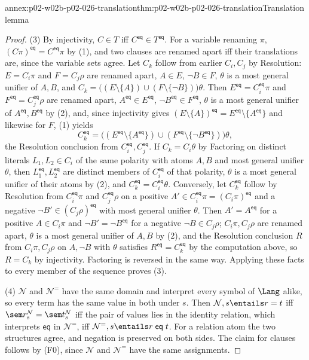 \begin{annexitem}{annex:p02-w02b-p02-026-translation}{thm:p02-w02b-p02-026-translation}{Translation lemma}
\begin{proof}
(3)  By injectivity, \(C\in T\) iff \(C^{\mathsf{eq}}\in T^{\mathsf{eq}}\).
For a variable renaming \(\pi\), \((C\pi)^{\mathsf{eq}}=C^{\mathsf{eq}}\pi\)
by (1), and two clauses are renamed apart iff their translations are, since
the variable sets agree.  Let \(C_k\) follow from earlier \(C_i,C_j\) by
Resolution: \(E=C_i\pi\) and \(F=C_j\rho\) are renamed apart, \(A\in E\),
\(\neg B\in F\), \(\theta\) is a most general unifier of \(A,B\), and
\(C_k=\bigl((E\setminus\{A\})\cup(F\setminus\{\neg B\})\bigr)\theta\).  Then
\(E^{\mathsf{eq}}=C_i^{\mathsf{eq}}\pi\) and
\(F^{\mathsf{eq}}=C_j^{\mathsf{eq}}\rho\) are renamed apart,
\(A^{\mathsf{eq}}\in E^{\mathsf{eq}}\), \(\neg B^{\mathsf{eq}}\in F^{\mathsf{eq}}\),
\(\theta\) is a most general unifier of \(A^{\mathsf{eq}},B^{\mathsf{eq}}\) by
(2), and, since injectivity gives
\((E\setminus\{A\})^{\mathsf{eq}}=E^{\mathsf{eq}}\setminus\{A^{\mathsf{eq}}\}\)
and likewise for \(F\), (1) yields
\[
 C_k^{\mathsf{eq}}
 =\bigl((E^{\mathsf{eq}}\setminus\{A^{\mathsf{eq}}\})\cup
   (F^{\mathsf{eq}}\setminus\{\neg B^{\mathsf{eq}}\})\bigr)\theta ,
\]
the Resolution conclusion from \(C_i^{\mathsf{eq}},C_j^{\mathsf{eq}}\).  If
\(C_k=C_i\theta\) by Factoring on distinct literals \(L_1,L_2\in C_i\) of the
same polarity with atoms \(A,B\) and most general unifier \(\theta\), then
\(L_1^{\mathsf{eq}},L_2^{\mathsf{eq}}\) are distinct members of
\(C_i^{\mathsf{eq}}\) of that polarity, \(\theta\) is a most general unifier
of their atoms by (2), and \(C_k^{\mathsf{eq}}=C_i^{\mathsf{eq}}\theta\).
Conversely, let \(C_k^{\mathsf{eq}}\) follow by Resolution from
\(C_i^{\mathsf{eq}}\pi\) and \(C_j^{\mathsf{eq}}\rho\) on a positive
\(A'\in C_i^{\mathsf{eq}}\pi=(C_i\pi)^{\mathsf{eq}}\) and a negative
\(\neg B'\in(C_j\rho)^{\mathsf{eq}}\) with most general unifier \(\theta\).
Then \(A'=A^{\mathsf{eq}}\) for a positive \(A\in C_i\pi\) and
\(\neg B'=\neg B^{\mathsf{eq}}\) for a negative \(\neg B\in C_j\rho\);
\(C_i\pi,C_j\rho\) are renamed apart, \(\theta\) is a most general unifier of
\(A,B\) by (2), and the Resolution conclusion \(R\) from \(C_i\pi,C_j\rho\) on
\(A,\neg B\) with \(\theta\) satisfies \(R^{\mathsf{eq}}=C_k^{\mathsf{eq}}\) by
the computation above, so \(R=C_k\) by injectivity.  Factoring is reversed in
the same way.  Applying these facts to every member of the sequence proves
(3).

(4)  \(\mathcal N\) and \(\mathcal N^{=}\) have the same domain and interpret
every symbol of \(\Lang\) alike, so every term has the same value in both under
\(s\).  Then \(\mathcal N,s\entails r=t\) iff
\(\sem r^{\mathcal N}_s=\sem t^{\mathcal N}_s\) iff the pair of values lies in
the identity relation, which interprets \(\mathsf{eq}\) in \(\mathcal N^{=}\),
iff \(\mathcal N^{=},s\entails r\mathrel{\mathsf{eq}}t\).  For a relation atom
the two structures agree, and negation is preserved on both sides.  The claim
for clauses follows by (F0), since \(\mathcal N\) and \(\mathcal N^{=}\) have
the same assignments.
\end{proof}
\end{annexitem}

